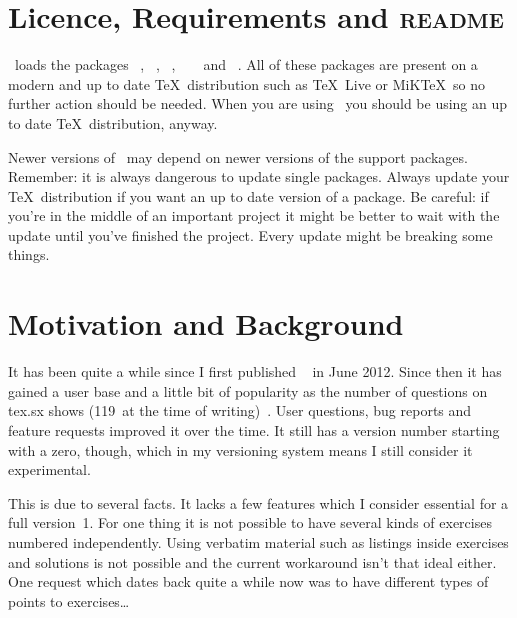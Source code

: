 \documentclass{xsim-manual}
\begin{document}
\section{Licence, Requirements and \texorpdfstring{\textsc{readme}}{README}}
\license

\xsim\ loads the packages ~\cite{bnd:l3kernel},
~\cite{bnd:l3packages}, ~\cite{pkg:etoolbox},
~\cite{pkg:array} ~\cite{pkg:booktabs} and
~\cite{pkg:translations}.  All of these packages are present
on a modern and up to date \TeX\ distribution such as \TeX~Live or MiK\TeX\ so
no further action should be needed.  When you are using \xsim\ you should be
using an up to date \TeX\ distribution, anyway.

\begin{bewareofthedog}
  Newer versions of \xsim\ may depend on newer versions of the support
  packages.  Remember: it is always dangerous to update single packages.
  Always update your \TeX\ distribution if you want an up to date version of a
  package.  Be careful: if you're in the middle of an important project it
  might be better to wait with the update until you've finished the project.
  Every update might be breaking some things.
\end{bewareofthedog}

\section{Motivation and Background}

It has been quite a while since I first published
~\cite{pkg:exsheets} in June 2012.  Since then it has gained a
user base and a little bit of popularity as the number of questions on tex.sx
shows (119~at the time of writing)~\cite{texsx:tagged/exsheets}.  User
questions, bug reports and feature requests improved it over the time.  It
still has a version number starting with a zero, though, which in my
versioning system means I still consider it experimental.

This is due to several facts.  It lacks a few features which I consider
essential for a full version~1.  For one thing it is not possible to have
several kinds of exercises numbered independently.  Using verbatim material
such as listings inside exercises and solutions is not possible and the
current workaround isn't that ideal either.  One request which dates back
quite a while now was to have different types of points to exercises\ldots
\end{document}
